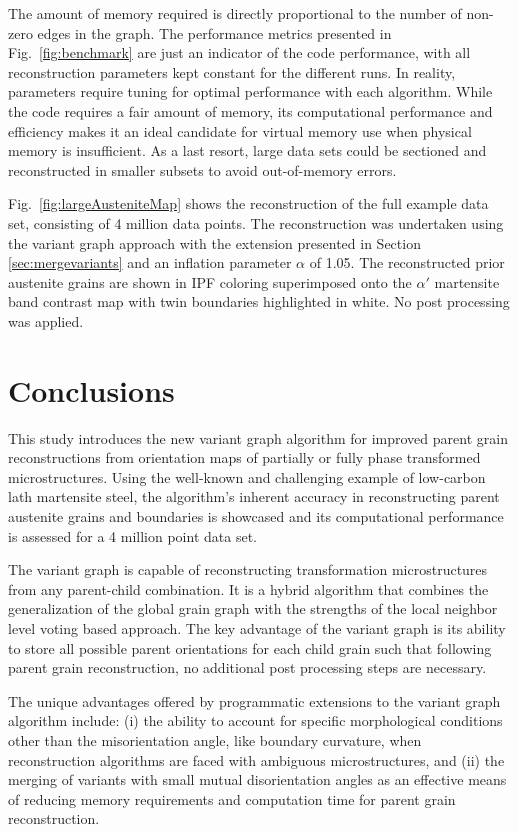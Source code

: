 \documentclass{elsarticle}
\numberwithin{equation}{section}
\begin{document}
The amount of memory required is directly proportional to the number of non-zero edges in the graph. The performance metrics presented in Fig.~\ref{fig:benchmark} are just an indicator of the code performance, with all reconstruction parameters kept constant for the different runs. In reality, parameters require tuning for optimal performance with each algorithm. While the code requires a fair amount of memory, its computational performance and efficiency makes it an ideal candidate for virtual memory use when physical memory is insufficient. As a last resort, large data sets could be sectioned and reconstructed in smaller subsets to avoid out-of-memory errors.

Fig.~\ref{fig:largeAusteniteMap} shows the reconstruction of the full example data set, consisting of 4 million data points. The reconstruction was undertaken using the variant graph approach with the extension presented in Section \ref{sec:mergevariants} and an inflation parameter $\alpha$ of 1.05. The reconstructed prior austenite grains are shown in IPF coloring superimposed onto the $\alpha'$ martensite band contrast map with twin boundaries highlighted in white. No post processing was applied.



\section{Conclusions}
\label{sec:conclusions}
This study introduces the new variant graph algorithm for improved parent grain reconstructions from orientation maps of partially or fully phase transformed microstructures. Using the well-known and challenging example of low-carbon lath martensite steel, the algorithm's inherent accuracy in reconstructing parent austenite grains and boundaries is showcased and its computational performance is assessed for a 4 million point data set.  

The variant graph is capable of reconstructing transformation microstructures from any parent-child combination. It is a hybrid algorithm that combines the generalization of the global grain graph with the strengths of the local neighbor level voting based approach. The key advantage of the variant graph is its ability to store all possible parent orientations for each child grain such that following parent grain reconstruction, no additional post processing steps are necessary.

The unique advantages offered by programmatic extensions to the variant graph algorithm include: (i) the ability to account for specific morphological conditions other than the misorientation angle, like boundary curvature, when reconstruction algorithms are faced with ambiguous microstructures, and (ii) the merging of variants with small mutual disorientation angles as an effective means of reducing memory requirements and computation time for parent grain reconstruction.
\end{document}
